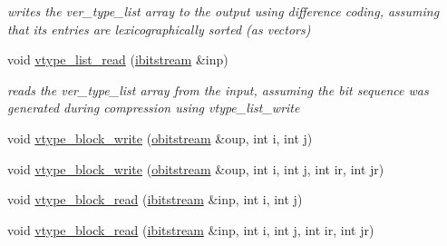 \begin{DoxyCompactItemize}
\begin{DoxyCompactList}\small\item\em writes the ver\+\_\+type\+\_\+list array to the output using difference coding, assuming that its entries are lexicographically sorted (as vectors) \end{DoxyCompactList}\item 
void \hyperlink{classmarked__graph__compressed_af29f16cbd56583652118eb24a7c233b7}{vtype\+\_\+list\+\_\+read} (\hyperlink{classibitstream}{ibitstream} \&inp)
\begin{DoxyCompactList}\small\item\em reads the ver\+\_\+type\+\_\+list array from the input, assuming the bit sequence was generated during compression using vtype\+\_\+list\+\_\+write \end{DoxyCompactList}\item 
void \hyperlink{classmarked__graph__compressed_a31f9ea72682f9072d0f90faf58a603fe}{vtype\+\_\+block\+\_\+write} (\hyperlink{classobitstream}{obitstream} \&oup, int i, int j)
\item 
void \hyperlink{classmarked__graph__compressed_ad443f83015addcc0f2b0e35351ae9362}{vtype\+\_\+block\+\_\+write} (\hyperlink{classobitstream}{obitstream} \&oup, int i, int j, int ir, int jr)
\item 
void \hyperlink{classmarked__graph__compressed_a4bf8563a2dfd3038dc5833c014320487}{vtype\+\_\+block\+\_\+read} (\hyperlink{classibitstream}{ibitstream} \&inp, int i, int j)
\item 
void \hyperlink{classmarked__graph__compressed_a01a434f3313d99b5877eddacb380cf15}{vtype\+\_\+block\+\_\+read} (\hyperlink{classibitstream}{ibitstream} \&inp, int i, int j, int ir, int jr)
\end{DoxyCompactItemize}
